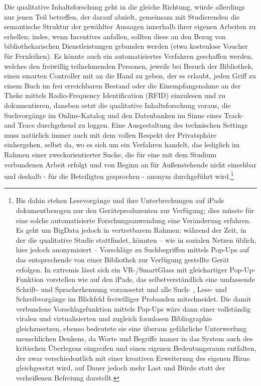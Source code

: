 \documentclass[a4paper,
fontsize=11pt,
oneside,
numbers=noperiodatend,
parskip=half-,
bibliography=totoc,
final
]{scrartcl}
\begin{document}
Die qualitative Inhaltsforschung geht in die gleiche Richtung, würde
allerdings nur jenen Teil betreffen, der darauf abzielt, gemeinsam mit
Studierenden die semantische Struktur der gewählter Aussagen innerhalb
ihrer eigenen Arbeiten zu erhellen; indes, wenn Incentives anfallen,
sollten diese an den Bezug von bibliothekarischen Dienstleistungen
gebunden werden (etwa kostenlose Voucher für Fernleihen). Es könnte auch
ein automatisiertes Verfahren geschaffen werden, welches den freiwillig
teilnehmenden Personen, jeweils bei Besuch der Bibliothek, einen smarten
Controller mit an die Hand zu geben, der es erlaubt, jeden Griff zu
einem Buch im frei erreichbaren Bestand oder die Einempfangsnahme an der
Theke mittels Radio-Frequency Identification (RFID) einzulesen und zu
dokumentieren, daneben setzt die qualitative Inhaltsforschung voraus,
die Suchvorgänge im Online-Katalog und den Datenbanken im Sinne eines
Track- and Trace durchgehend zu loggen. Eine Ausgestaltung des
technischen Settings muss natürlich immer auch mit dem vollen Respekt
der Privatsphäre einhergehen, selbst da, wo es sich um ein Verfahren
handelt, das lediglich im Rahmen einer zweckorientierter Suche, die für
eine mit dem Studium verbundenen Arbeit erfolgt und von Beginn an für
Außenstehende nicht einsehbar und deshalb - für die Beteiligten
gesprochen - anonym durchgeführt wird.\footnote{Bis dahin stehen
  Lesevorgänge und ihre Unterbrechungen auf iPads dokumentbezogen nur
  den Geräteproduzenten zur Verfügung; dies müsste für eine solche
  automatisierte Forschungsanwendung eine Veränderung erfahren. Es geht
  um BigData jedoch in vertretbarem Rahmen: während der Zeit, in der die
  qualitative Studie stattfindet, könnten -- wie in sozialen Netzen
  üblich, hier jedoch anonymisiert -- Vorschläge zu Suchbegriffen
  mittels Pop-Ups auf das entsprechende von einer Bibliothek zur
  Verfügung gestellte Gerät erfolgen. In extremis lässt sich ein
  VR-/SmartGlass mit gleichartiger Pop-Up-Funktion vorstellen wie auf
  den iPads, das selbstverständlich eine umfassende Schrift- und
  Spracherkennung voraussetzt und alle Such- , Lese- und Schreibvorgänge
  im Blickfeld freiwilliger Probanden mitschneidet. Die damit verbundene
  Vorschlagsfunktion mittels Pop-Ups wäre dann einer vollständig viralen
  und virtualisierten und zugleich formlosen Bibliographie
  gleichzusetzen, ebenso bedeutete sie eine überaus gefährliche
  Unterwerfung menschlichen Denkens, da Worte und Begriffe immer in das
  System auch des kritischen Überlegens eingreifen und einen eigenen
  Bedeutungsraum entfalten, der zwar verschiedentlich mit einer
  kreativen Erweiterung des eigenen Hirns gleichgesetzt wird, auf Dauer
  jedoch mehr Last und Bürde statt der verheißenen Befreiung darstellt.}
\end{document}
